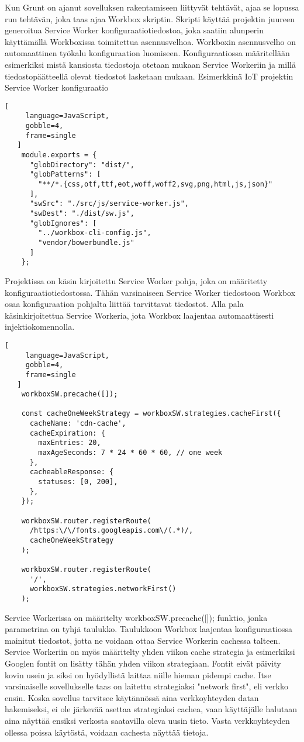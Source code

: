 \documentclass{tktltiki}
\begin{document}
Kun Grunt on ajanut sovelluksen rakentamiseen liittyvät tehtävät, ajaa se lopussa run tehtävän, joka taas ajaa Workbox skriptin. Skripti käyttää projektin juureen generoitua Service Worker konfiguraatiotiedostoa, joka saatiin alunperin käyttämällä Workboxissa toimitettua asennusvelhoa. Workboxin asennusvelho on automaattinen työkalu konfiguraation luomiseen. Konfiguraatiossa määritellään esimerkiksi mistä kansiosta tiedostoja otetaan mukaan Service Workeriin ja millä tiedostopäätteellä olevat tiedostot lasketaan mukaan. Esimerkkinä IoT projektin Service Worker konfiguraatio

\begin{lstlisting}[
     language=JavaScript,
     gobble=4,
     frame=single
   ]
    module.exports = {
      "globDirectory": "dist/",
      "globPatterns": [
        "**/*.{css,otf,ttf,eot,woff,woff2,svg,png,html,js,json}"
      ],
      "swSrc": "./src/js/service-worker.js",
      "swDest": "./dist/sw.js",
      "globIgnores": [
        "../workbox-cli-config.js",
        "vendor/bowerbundle.js"
      ]
    };
\end{lstlisting}

Projektissa on käsin kirjoitettu Service Worker pohja, joka on määritetty konfiguraatiotiedostossa. Tähän varsinaiseen Service Worker tiedostoon Workbox osaa konfiguraation pohjalta liittää tarvittavat tiedostot. Alla pala käsinkirjoitettua Service Workeria, jota Workbox laajentaa automaattisesti injektiokomennolla.

\begin{lstlisting}[
     language=JavaScript,
     gobble=4,
     frame=single
   ]
    workboxSW.precache([]);
    
    const cacheOneWeekStrategy = workboxSW.strategies.cacheFirst({
      cacheName: 'cdn-cache',
      cacheExpiration: {
        maxEntries: 20,
        maxAgeSeconds: 7 * 24 * 60 * 60, // one week
      },
      cacheableResponse: {
        statuses: [0, 200],
      },
    });
    
    workboxSW.router.registerRoute(
      /https:\/\/fonts.googleapis.com\/(.*)/,
      cacheOneWeekStrategy
    );
    
    workboxSW.router.registerRoute(
      '/',
      workboxSW.strategies.networkFirst()
    );
\end{lstlisting}

Service Workerissa on määritelty workboxSW.precache([]); funktio, jonka parametrina on tyhjä taulukko. Taulukkoon Workbox laajentaa konfiguraatiossa mainitut tiedostot, jotta ne voidaan ottaa Service Workerin cachessa talteen. Service Workeriin on myös määritelty yhden viikon cache strategia ja esimerkiksi Googlen fontit on lisätty tähän yhden viikon strategiaan. Fontit eivät päivity kovin usein ja siksi on hyödyllistä laittaa niille hieman pidempi cache. Itse varsinaiselle sovellukselle taas on laitettu strategiaksi "network first", eli verkko ensin. Koska sovellus tarvitsee käytännössä aina verkkoyhteyden datan hakemiseksi, ei ole järkevää asettaa strategiaksi cachea, vaan käyttäjälle halutaan aina näyttää ensiksi verkosta saatavilla oleva uusin tieto. Vasta verkkoyhteyden ollessa poissa käytöstä, voidaan cachesta näyttää tietoja. 
\end{document}
